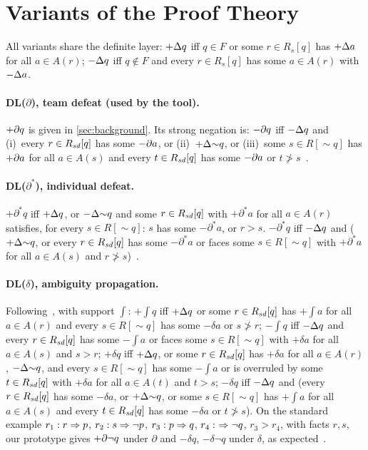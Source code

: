 \section{Variants of the Proof Theory}
\label{app:variants}

All variants share the definite layer: $+\Delta q$ iff $q\in F$ or some $r\in R_s[q]$ has $+\Delta a$ for all $a\in A(r)$; $-\Delta q$ iff $q\notin F$ and every $r\in R_s[q]$ has some $a\in A(r)$ with $-\Delta a$.

\paragraph{DL($\partial$), team defeat (used by the tool).} $+\partial q$ is given in \cref{sec:background}. Its strong negation is: $-\partial q$ iff $-\Delta q$ and (i)~every $r\in R_{\mathit{sd}}[q]$ has some $-\partial a$, or (ii)~$+\Delta{\sim}q$, or (iii)~some $s\in R[{\sim}q]$ has $+\partial a$ for all $a\in A(s)$ and every $t\in R_{\mathit{sd}}[q]$ has some $-\partial a$ or $t\not>s$~\cite{antoniou2001representation}.

\paragraph{DL($\partial^*$), individual defeat.} $+\partial^* q$ iff $+\Delta q$, or $-\Delta{\sim}q$ and some $r\in R_{\mathit{sd}}[q]$ with $+\partial^*a$ for all $a\in A(r)$ satisfies, for every $s\in R[{\sim}q]$: $s$ has some $-\partial^*a$, or $r>s$. $-\partial^*q$ iff $-\Delta q$ and ($+\Delta{\sim}q$, or every $r\in R_{\mathit{sd}}[q]$ has some $-\partial^* a$ or faces some $s\in R[{\sim}q]$ with $+\partial^* a$ for all $a\in A(s)$ and $r\not>s$)~\cite{billington1993defeasible}.

\paragraph{DL($\delta$), ambiguity propagation.} Following~\cite{antoniou2000flexible}, with support $\int$:
$+\!\int q$ iff $+\Delta q$ or some $r\in R_{\mathit{sd}}[q]$ has $+\!\int a$ for all $a\in A(r)$ and every $s\in R[{\sim}q]$ has some $-\delta a$ or $s\not>r$;
$-\!\int q$ iff $-\Delta q$ and every $r\in R_{\mathit{sd}}[q]$ has some $-\!\int a$ or faces some $s\in R[{\sim}q]$ with $+\delta a$ for all $a\in A(s)$ and $s>r$;
$+\delta q$ iff $+\Delta q$, or some $r\in R_{\mathit{sd}}[q]$ has $+\delta a$ for all $a\in A(r)$, $-\Delta{\sim}q$, and every $s\in R[{\sim}q]$ has some $-\!\int a$ or is overruled by some $t\in R_{\mathit{sd}}[q]$ with $+\delta a$ for all $a\in A(t)$ and $t>s$;
$-\delta q$ iff $-\Delta q$ and (every $r\in R_{\mathit{sd}}[q]$ has some $-\delta a$, or $+\Delta{\sim}q$, or some $s\in R[{\sim}q]$ has $+\!\int a$ for all $a\in A(s)$ and every $t\in R_{\mathit{sd}}[q]$ has some $-\delta a$ or $t\not>s$).
On the standard example $r_1: r\Rightarrow p$, $r_2: s\Rightarrow\neg p$, $r_3: p\Rightarrow q$, $r_4:\ \Rightarrow\neg q$, $r_3>r_4$, with facts $r,s$, our prototype gives $+\partial\neg q$ under $\partial$ and $-\delta q$, $-\delta\neg q$ under $\delta$, as expected~\cite{antoniou2000flexible}.

